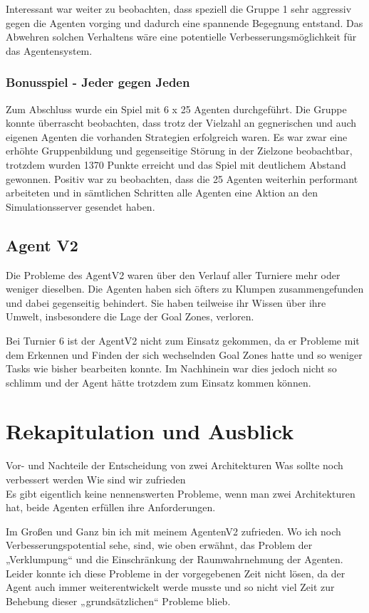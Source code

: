 \documentclass[runningheads]{llncs}
\begin{document}
Interessant war weiter zu beobachten, dass speziell die Gruppe 1 sehr aggressiv gegen die Agenten vorging und dadurch eine spannende Begegnung entstand. Das Abwehren solchen Verhaltens wäre eine potentielle Verbesserungsmöglichkeit für das Agentensystem. 

\subsubsection{Bonusspiel - Jeder gegen Jeden}
Zum Abschluss wurde ein Spiel mit 6 x 25 Agenten durchgeführt. Die Gruppe konnte überrascht beobachten, dass trotz der Vielzahl an gegnerischen und auch eigenen Agenten die vorhanden Strategien erfolgreich waren. Es war zwar eine erhöhte Gruppenbildung und gegenseitige Störung in der Zielzone beobachtbar, trotzdem wurden 1370 Punkte erreicht und das Spiel mit deutlichem Abstand gewonnen.
Positiv war zu beobachten, dass die 25 Agenten weiterhin performant arbeiteten und in sämtlichen Schritten alle Agenten eine Aktion an den Simulationsserver gesendet haben.  





\subsection{Agent V2}
Die Probleme des AgentV2 waren über den Verlauf aller Turniere mehr oder weniger dieselben.  Die Agenten haben sich öfters zu Klumpen zusammengefunden und dabei gegenseitig behindert. Sie haben teilweise ihr Wissen über ihre Umwelt, insbesondere die Lage der Goal Zones, verloren. 

Bei Turnier 6 ist der AgentV2 nicht zum Einsatz gekommen, da er Probleme mit dem Erkennen und Finden der sich wechselnden Goal Zones hatte und so weniger Tasks wie bisher bearbeiten konnte. Im Nachhinein war dies jedoch nicht so schlimm und der Agent hätte trotzdem zum Einsatz kommen können. 

\section{Rekapitulation und Ausblick}
Vor- und Nachteile der Entscheidung von zwei Architekturen
Was sollte noch verbessert werden
Wie sind wir zufrieden\\

Es gibt eigentlich keine nennenswerten Probleme, wenn man zwei Architekturen hat, beide Agenten erfüllen ihre Anforderungen. 

Im Großen und Ganz bin ich mit meinem AgentenV2 zufrieden. Wo ich noch Verbesserungspotential sehe, sind, wie oben erwähnt, das Problem der „Verklumpung“ und die Einschränkung der Raumwahrnehmung der Agenten. Leider konnte ich diese Probleme in der vorgegebenen Zeit nicht lösen, da der Agent auch immer weiterentwickelt werde musste und so nicht viel Zeit zur Behebung dieser „grundsätzlichen“ Probleme blieb.
\end{document}
